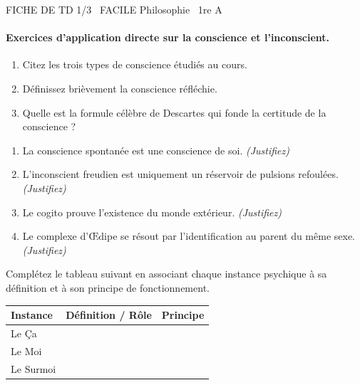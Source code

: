 \documentclass[11pt]{article}
\begin{document}
\begin{tcolorbox}[enhanced,colback=popink,colframe=popink,arc=10pt,boxrule=0pt,left=12pt,right=12pt,top=9pt,bottom=9pt]
{\color{white}\popxbold\small FICHE DE TD 1/3 \textbullet\ FACILE \hfill Philosophie \textbullet\ 1re A\par}
\end{tcolorbox}
\vspace{4pt}
\paragraph{Exercices d'application directe sur la conscience et l'inconscient.}

\begin{exercice}
\begin{enumerate}
    \item Citez les trois types de conscience étudiés au cours.
    \item Définissez brièvement la conscience réfléchie.
    \item Quelle est la formule célèbre de Descartes qui fonde la certitude de la conscience ? 
\end{enumerate}
\end{exercice}

\begin{exercice}
\begin{enumerate}
    \item La conscience spontanée est une conscience de soi. \textit{(Justifiez)}
    \item L'inconscient freudien est uniquement un réservoir de pulsions refoulées. \textit{(Justifiez)}
    \item Le \og cogito \fg{} prouve l'existence du monde extérieur. \textit{(Justifiez)}
    \item Le complexe d'Œdipe se résout par l'identification au parent du même sexe. \textit{(Justifiez)}
\end{enumerate}
\end{exercice}

\begin{exercice}
Complétez le tableau suivant en associant chaque instance psychique à sa définition et à son principe de fonctionnement.

\begin{tabular}{|p{2.5cm}|p{5.5cm}|p{4.5cm}|}
\hline
\textbf{Instance} & \textbf{Définition / Rôle} & \textbf{Principe} \\
\hline
Le Ça & \dotfill & \dotfill \\
\hline
Le Moi & \dotfill & \dotfill \\
\hline
Le Surmoi & \dotfill & \dotfill \\
\hline
\end{tabular}
\end{exercice}
\end{document}
